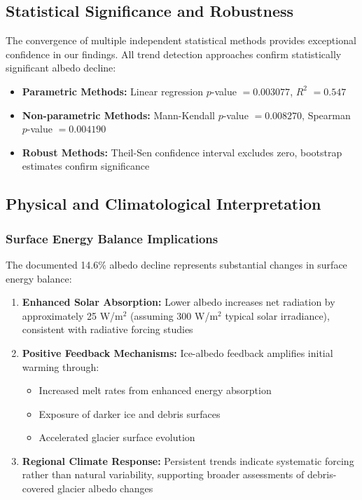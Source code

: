 \documentclass[12pt,a4paper]{article}
\newcommand{\pvalue}{$p$-value}
\newcommand{\rsquared}{$R^2$}
\begin{document}
\subsection{Statistical Significance and Robustness}

The convergence of multiple independent statistical methods provides exceptional confidence in our findings. All trend detection approaches confirm statistically significant albedo decline:

\begin{itemize}
    \item \textbf{Parametric Methods:} Linear regression \pvalue{} $= 0.003077$, \rsquared{} $= 0.547$
    \item \textbf{Non-parametric Methods:} Mann-Kendall \pvalue{} $= 0.008270$, Spearman \pvalue{} $= 0.004190$
    \item \textbf{Robust Methods:} Theil-Sen confidence interval excludes zero, bootstrap estimates confirm significance
\end{itemize}

\subsection{Physical and Climatological Interpretation}

\subsubsection{Surface Energy Balance Implications}

The documented 14.6\% albedo decline represents substantial changes in surface energy balance:

\begin{enumerate}
    \item \textbf{Enhanced Solar Absorption:} Lower albedo increases net radiation by approximately 25 W/m$^2$ (assuming 300 W/m$^2$ typical solar irradiance), consistent with radiative forcing studies \cite{Skiles2018DustSnow}
    
    \item \textbf{Positive Feedback Mechanisms:} Ice-albedo feedback amplifies initial warming through:
    \begin{itemize}
        \item Increased melt rates from enhanced energy absorption
        \item Exposure of darker ice and debris surfaces  
        \item Accelerated glacier surface evolution
    \end{itemize}
    
    \item \textbf{Regional Climate Response:} Persistent trends indicate systematic forcing rather than natural variability, supporting broader assessments of debris-covered glacier albedo changes \cite{Rounce2023HighMountainAsia}
\end{enumerate}
\end{document}
